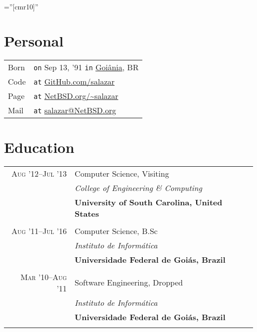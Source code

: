 \documentclass[a4paper,10pt]{article}
\begin{document}
\font\fb=''[cmr10]''

\par{\bigskip\par\vspace{8ex}}

\section{Personal}
\begin{tabular}{l@{\hskip 0.2cm}l}
  Born & \texttt{on} Sep 13, '91 \texttt{in}
                     \href{https://en.wikipedia.org/wiki/Goiania}{Goiânia}, BR \\
  Code & \texttt{at} \href{https://www.github.com/salazar/}
                          {GitHub.com/salazar} \\
  Page & \texttt{at} \href{https://www.netbsd.org/~salazar}
                          {NetBSD.org/\textasciitilde salazar} \\
  Mail & \texttt{at} \href{mailto:salazar@NetBSD.org}
                          {salazar@NetBSD.org} 
\end{tabular}

\section{Education}
\begin{tabular}{r|p{11cm}}

  \textsc{Aug '12--Jul '13} & Computer Science, Visiting\\ &
  \emph{College of Engineering \& Computing}\\ &
  \textbf{University of South Carolina, United States}
  \\\multicolumn{2}{c}{} \\

  \textsc{Aug '11--Jul '16} & Computer Science, B.Sc\\ &
  \emph{Instituto de Informática}\\ &
  \textbf{Universidade Federal de Goiás, Brazil}
  \\\multicolumn{2}{c}{} \\

  \textsc{Mar '10--Aug '11} & Software Engineering, Dropped \\ &
  \emph{Instituto de Informática}\\ &
  \textbf{Universidade Federal de Goiás, Brazil}
  \\\multicolumn{2}{c}{}

\end{tabular}
\end{document}
